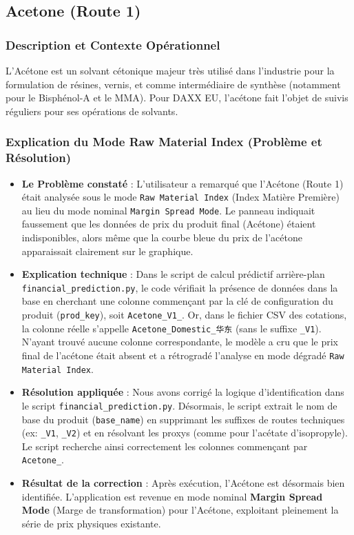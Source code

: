 \documentclass[12pt,a4paper]{article}
\begin{document}
\subsection{Acetone (Route 1)}

\subsubsection{Description et Contexte Opérationnel}
L'Acétone est un solvant cétonique majeur très utilisé dans l'industrie pour la formulation de résines, vernis, et comme intermédiaire de synthèse (notamment pour le Bisphénol-A et le MMA). Pour DAXX EU, l'acétone fait l'objet de suivis réguliers pour ses opérations de solvants.

\subsubsection{Explication du Mode Raw Material Index (Problème et Résolution)}
\begin{itemize}
    \item \textbf{Le Problème constaté} : L'utilisateur a remarqué que l'Acétone (Route 1) était analysée sous le mode \texttt{Raw Material Index} (Index Matière Première) au lieu du mode nominal \texttt{Margin Spread Mode}. Le panneau indiquait faussement que les données de prix du produit final (Acétone) étaient indisponibles, alors même que la courbe bleue du prix de l'acétone apparaissait clairement sur le graphique.
    \item \textbf{Explication technique} : Dans le script de calcul prédictif arrière-plan \texttt{financial_prediction.py}, le code vérifiait la présence de données dans la base en cherchant une colonne commençant par la clé de configuration du produit (\texttt{prod\_key}), soit \texttt{Acetone\_V1\_}. Or, dans le fichier CSV des cotations, la colonne réelle s'appelle \texttt{Acetone\_Domestic\_华东} (sans le suffixe \texttt{\_V1}). N'ayant trouvé aucune colonne correspondante, le modèle a cru que le prix final de l'acétone était absent et a rétrogradé l'analyse en mode dégradé \texttt{Raw Material Index}.
    \item \textbf{Résolution appliquée} : Nous avons corrigé la logique d'identification dans le script \texttt{financial\_prediction.py}. Désormais, le script extrait le nom de base du produit (\texttt{base\_name}) en supprimant les suffixes de routes techniques (ex: \texttt{\_V1}, \texttt{\_V2}) et en résolvant les proxys (comme pour l'acétate d'isopropyle). Le script recherche ainsi correctement les colonnes commençant par \texttt{Acetone\_}.
    \item \textbf{Résultat de la correction} : Après exécution, l'Acétone est désormais bien identifiée. L'application est revenue en mode nominal \textbf{Margin Spread Mode} (Marge de transformation) pour l'Acétone, exploitant pleinement la série de prix physiques existante.
\end{itemize}
\end{document}
